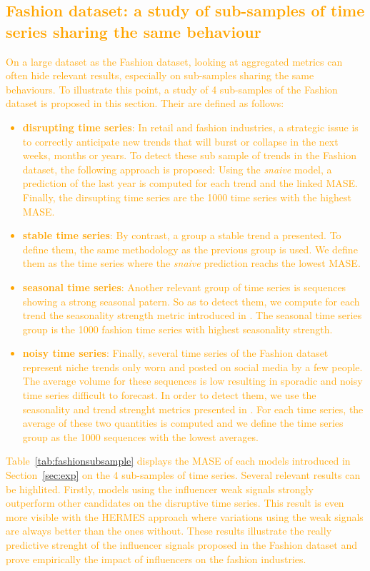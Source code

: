 \documentclass[10pt]{article} %
\begin{document}
\textcolor{orange}{
\section{Fashion dataset: a study of sub-samples of time series sharing the same behaviour}
}
\textcolor{orange}{
On a large dataset as the Fashion dataset, looking at aggregated metrics can often hide relevant results, especially on sub-samples sharing the same behaviours. To illustrate this point, a study of 4 sub-samples of the Fashion dataset is proposed in this section. Their are defined as follows:
\begin{itemize}
\item \textbf{disrupting time series}: In retail and fashion industries, a strategic issue is to correctly anticipate new trends that will burst or collapse in the next weeks, months or years. To detect these sub sample of trends in the Fashion dataset, the following approach is proposed: Using the \textit{snaive} model, a prediction of the last year is computed for each trend and the linked MASE. Finally, the dirsupting time series are the 1000 time series with the highest MASE.
\item \textbf{stable time series}: By contrast, a group a stable trend a presented. To define them, the same methodology as the previous group is used. We define them as the time series where the \textit{snaive} prediction reachs the lowest MASE. 
\item \textbf{seasonal time series}: Another relevant group of time series is sequences showing a strong seasonal patern. So as to detect them, we compute for each trend the seasonality strength metric introduced in \citet{wang2006}. The seasonal time series group is the 1000 fashion time series with highest seasonality strength.
\item \textbf{noisy time series}: Finally, several time series of the Fashion dataset represent niche trends only worn and posted on social media by a few people. The average volume for these sequences is low resulting in sporadic and noisy time series difficult to forecast. In order to detect them, we use the seasonality and trend strenght metrics presented in \citet{wang2006}. For each time series, the average of these two quantities is computed and we define the time series group as the 1000 sequences with the lowest averages.
\end{itemize}
Table~\ref{tab:fashionsubsample} displays the MASE of each models introduced in Section~\ref{sec:exp} on the 4 sub-samples of time series. Several relevant results can be highlited. Firstly, models using the influencer weak signals strongly outperform other candidates on the disruptive time series. This result is even more visible with the HERMES approach where variations using the weak signals are always better than the ones without. These results illustrate the really predictive strenght of the influencer signals proposed in the Fashion dataset and prove empirically the impact of influencers on the fashion industries.
}
\end{document}
